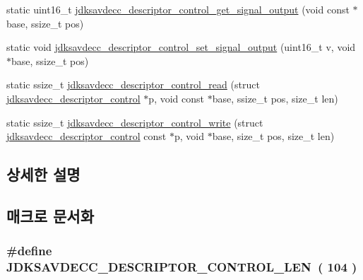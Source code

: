 \begin{DoxyCompactItemize}
\item 
static uint16\+\_\+t \hyperlink{group__descriptor__control_ga49525851775e5480cb7914b29d9f7f78}{jdksavdecc\+\_\+descriptor\+\_\+control\+\_\+get\+\_\+signal\+\_\+output} (void const $\ast$base, ssize\+\_\+t pos)
\item 
static void \hyperlink{group__descriptor__control_gaacbe07116eecbed5629993506cb4eda0}{jdksavdecc\+\_\+descriptor\+\_\+control\+\_\+set\+\_\+signal\+\_\+output} (uint16\+\_\+t v, void $\ast$base, ssize\+\_\+t pos)
\item 
static ssize\+\_\+t \hyperlink{group__descriptor__control_gae15051b558b20d26016546c977b7cbb4}{jdksavdecc\+\_\+descriptor\+\_\+control\+\_\+read} (struct \hyperlink{structjdksavdecc__descriptor__control}{jdksavdecc\+\_\+descriptor\+\_\+control} $\ast$p, void const $\ast$base, ssize\+\_\+t pos, size\+\_\+t len)
\item 
static ssize\+\_\+t \hyperlink{group__descriptor__control_gac9d02e62bb2f9fff2ee663c184caacbf}{jdksavdecc\+\_\+descriptor\+\_\+control\+\_\+write} (struct \hyperlink{structjdksavdecc__descriptor__control}{jdksavdecc\+\_\+descriptor\+\_\+control} const $\ast$p, void $\ast$base, size\+\_\+t pos, size\+\_\+t len)
\end{DoxyCompactItemize}


\subsection{상세한 설명}


\subsection{매크로 문서화}
\subsubsection[{\texorpdfstring{J\+D\+K\+S\+A\+V\+D\+E\+C\+C\+\_\+\+D\+E\+S\+C\+R\+I\+P\+T\+O\+R\+\_\+\+C\+O\+N\+T\+R\+O\+L\+\_\+\+L\+EN}{JDKSAVDECC_DESCRIPTOR_CONTROL_LEN}}]{\setlength{\rightskip}{0pt plus 5cm}\#define J\+D\+K\+S\+A\+V\+D\+E\+C\+C\+\_\+\+D\+E\+S\+C\+R\+I\+P\+T\+O\+R\+\_\+\+C\+O\+N\+T\+R\+O\+L\+\_\+\+L\+EN~( 104 )}\hypertarget{group__descriptor__control_gae9df372af3485fb181d19f0a820260b1}{}\label{group__descriptor__control_gae9df372af3485fb181d19f0a820260b1}


